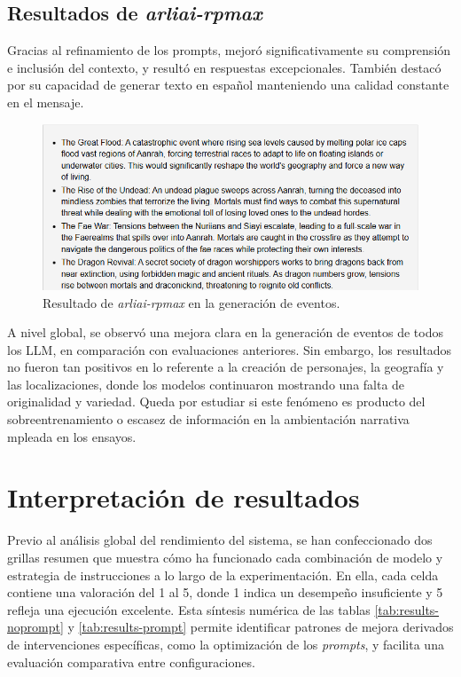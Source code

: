 \subsection{Resultados de \textit{arliai-rpmax}}
Gracias al refinamiento de los prompts,
mejoró significativamente su comprensión e inclusión del contexto,
y resultó en respuestas excepcionales.
También destacó por su capacidad de generar texto en español
manteniendo una calidad constante en el mensaje.

\begin{figure}[htbp]
	\centering
	\includegraphics[width=1\textwidth]{./Figures/rpmax-prompt-events.png}
	\caption{Resultado de \textit{arliai-rpmax} en la generación de eventos.}
	\label{fig:rpmax-events}
\end{figure}

A nivel global, se observó una mejora clara en la generación de eventos de todos los LLM,
en comparación con evaluaciones anteriores.
Sin embargo, los resultados no fueron tan positivos en lo referente a la creación de personajes,
la geografía y las localizaciones,
donde los modelos continuaron mostrando una falta de originalidad y variedad.
Queda por estudiar si este fenómeno es producto del sobreentrenamiento o escasez de información
en la ambientación narrativa mpleada en los ensayos.

\section{Interpretación de resultados}
Previo al análisis global del rendimiento del sistema,
se han confeccionado dos grillas resumen que muestra cómo ha funcionado
cada combinación de modelo y estrategia de instrucciones a lo largo de la experimentación.
En ella, cada celda contiene una valoración del 1 al 5,
donde 1 indica un desempeño insuficiente y 5 refleja una ejecución excelente.
Esta síntesis numérica de las tablas \ref{tab:results-noprompt} y \ref{tab:results-prompt}
permite identificar patrones de mejora derivados
de intervenciones específicas, como la optimización de los \textit{prompts},
y facilita una evaluación comparativa entre configuraciones.
 
